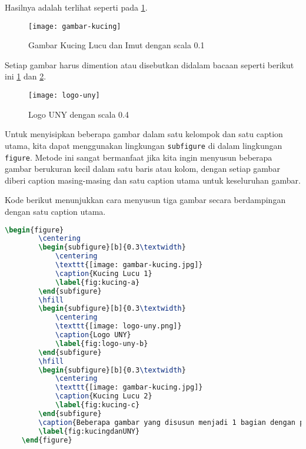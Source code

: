 Hasilnya adalah terlihat seperti pada \cref{fig:kucing}.

\begin{figure}[H]
    \centering
    \texttt{[image: gambar-kucing]}
    \caption{Gambar Kucing Lucu dan Imut dengan scala 0.1}
    \label{fig:kucing}
\end{figure}

Setiap gambar harus dimention atau disebutkan didalam bacaan seperti berikut ini \cref{fig:kucing} dan \cref{fig:logoUNY}.

\begin{figure}[H]
    \centering
    \texttt{[image: logo-uny]}
    \caption{Logo UNY dengan scala 0.4}
    \label{fig:logoUNY}
\end{figure}

Untuk menyisipkan beberapa gambar dalam satu kelompok dan satu caption utama, kita dapat menggunakan lingkungan \texttt{subfigure} di dalam lingkungan \texttt{figure}. Metode ini sangat bermanfaat jika kita ingin menyusun beberapa gambar berukuran kecil dalam satu baris atau kolom, dengan setiap gambar diberi caption masing-masing dan satu caption utama untuk keseluruhan gambar.

Kode berikut menunjukkan cara menyusun tiga gambar secara berdampingan dengan satu caption utama.

\begin{lstlisting}[language=TeX, caption=Kode untuk Menyisipkan Gambar dalam Dokumen dengan Subfigure, label=lst:kode_gambar_multi]
    \begin{figure}
        \centering
        \begin{subfigure}[b]{0.3\textwidth}
            \centering
            \texttt{[image: gambar-kucing.jpg]}
            \caption{Kucing Lucu 1}
            \label{fig:kucing-a}
        \end{subfigure}
        \hfill
        \begin{subfigure}[b]{0.3\textwidth}
            \centering
            \texttt{[image: logo-uny.png]}
            \caption{Logo UNY}
            \label{fig:logo-uny-b}
        \end{subfigure}
        \hfill
        \begin{subfigure}[b]{0.3\textwidth}
            \centering
            \texttt{[image: gambar-kucing.jpg]}
            \caption{Kucing Lucu 2}
            \label{fig:kucing-c}
        \end{subfigure}
        \caption{Beberapa gambar yang disusun menjadi 1 bagian dengan penomoran (a), (b), dan (c)}
        \label{fig:kucingdanUNY}
    \end{figure}
\end{lstlisting}

